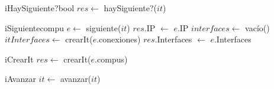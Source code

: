 \begin{Algoritmos}
  \begin{algoritmo}{iHaySiguiente?}{}{bool}{}
  $res \gets$ haySiguiente?($it$)\;
  \end{algoritmo}

  \begin{algoritmo}{iSiguiente}{}{compu}{}
     $e \gets$ siguiente($it$)\;
    $res$.IP $\gets$ $e$.IP\;
     $interfaces \gets$ vac\'{i}o()\;
     $itInterfaces \gets$ crearIt($e$.conexiones)\;
    $res$.Interfaces $\gets$ $e$.Interfaces\;
  \end{algoritmo}

  \begin{algoritmo}{iCrearIt}{}{}{}
  $res \gets$ crearIt($e$.compus)\;
  \end{algoritmo}

  \begin{algoritmo}{iAvanzar}{}{}{}
  $it \gets$ avanzar($it$)\;
  \end{algoritmo}
\end{Algoritmos}
